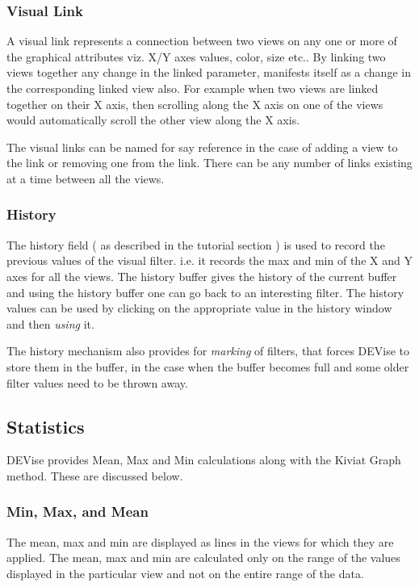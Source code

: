 \subsubsection{Visual Link}

A visual link represents a connection between two views on any one or more of the graphical  attributes viz. X/Y axes values, color, size etc.. By linking two views together any change in the linked parameter, manifests itself as a change in the corresponding linked view also. For example when two views are linked together on their X axis, then scrolling along the X axis on one of the views would automatically scroll the other view along the X axis. 

The visual links can be named for say reference in the case of adding a view to the link or removing one from the link. There can be any number of links existing at a time between all the views. 

\subsubsection{History}

The history field ( as described in the tutorial section ) is used to record the previous  values of the visual filter. i.e. it records the max and min of the X and Y axes for all the views. The history buffer gives the history of the current buffer and using the history buffer one can go back to an interesting filter. The history values can be used by clicking on the appropriate value in the history window and then {\em using } it.

The history mechanism also provides for {\em marking } of filters, that forces DEVise to store them in the buffer, in the case  when the buffer becomes full and some older filter values need to be thrown away.

\subsection{Statistics}

DEVise provides Mean, Max and Min calculations along with the Kiviat Graph method. These are discussed below.

\subsubsection{Min, Max, and Mean}

The mean, max and min are displayed as lines in the views for which they are applied. The mean, max and min  are calculated only on the range of the values displayed in the particular view and not on the entire range of the data.

